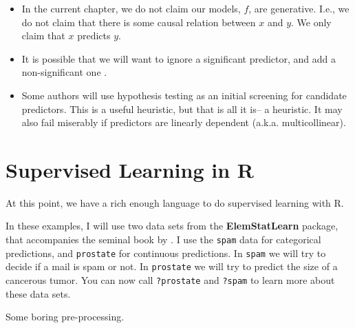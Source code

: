 \documentclass[]{book}
\providecommand{\tightlist}{%
  \setlength{\itemsep}{0pt}\setlength{\parskip}{0pt}}
\theoremstyle{definition}
\theoremstyle{definition}
\theoremstyle{definition}
\theoremstyle{remark}
\begin{document}
\begin{itemize}
\tightlist
\item
  In the current chapter, we do not claim our models, \(f\), are
  generative. I.e., we do not claim that there is some causal relation
  between \(x\) and \(y\). We only claim that \(x\) predicts \(y\).
\item
  It is possible that we will want to ignore a significant predictor,
  and add a non-significant one \citep{foster2004variable}.
\item
  Some authors will use hypothesis testing as an initial screening for
  candidate predictors. This is a useful heuristic, but that is all it
  is-- a heuristic. It may also fail miserably if predictors are
  linearly dependent (a.k.a. multicollinear).
\end{itemize}

\section{Supervised Learning in R}\label{supervised-learning-in-r}

At this point, we have a rich enough language to do supervised learning
with R.

In these examples, I will use two data sets from the
\textbf{ElemStatLearn} package, that accompanies the seminal book by
\citet{friedman2001elements}. I use the \texttt{spam} data for
categorical predictions, and \texttt{prostate} for continuous
predictions. In \texttt{spam} we will try to decide if a mail is spam or
not. In \texttt{prostate} we will try to predict the size of a cancerous
tumor. You can now call \texttt{?prostate} and \texttt{?spam} to learn
more about these data sets.

Some boring pre-processing.
\end{document}
